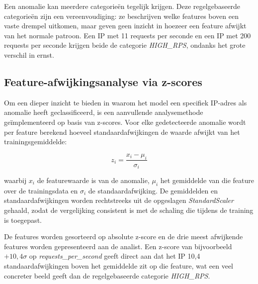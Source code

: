 Een anomalie kan meerdere categorieën tegelijk krijgen. Deze regelgebaseerde categorieën zijn een vereenvoudiging: ze beschrijven welke features boven een vaste drempel uitkomen, maar geven geen inzicht in hoezeer een feature afwijkt van het normale patroon. Een IP met 11 requests per seconde en een IP met 200 requests per seconde krijgen beide de categorie \textit{HIGH\_RPS}, ondanks het grote verschil in ernst.
 
\subsection{Feature-afwijkingsanalyse via z-scores}
\label{subsec:feature-afwijkingsanalyse}
 
Om een dieper inzicht te bieden in waarom het model een specifiek IP-adres als anomalie heeft geclassificeerd, is een aanvullende analysemethode geïmplementeerd op basis van z-scores. Voor elke gedetecteerde anomalie wordt per feature berekend hoeveel standaardafwijkingen de waarde afwijkt van het trainingsgemiddelde:
 
\begin{equation}
    z_i = \frac{x_i - \mu_i}{\sigma_i}
\end{equation}
 
waarbij $x_i$ de featurewaarde is van de anomalie, $\mu_i$ het gemiddelde van die feature over de trainingsdata en $\sigma_i$ de standaardafwijking. De gemiddelden en standaardafwijkingen worden rechtstreeks uit de opgeslagen \textit{StandardScaler} gehaald, zodat de vergelijking consistent is met de schaling die tijdens de training is toegepast.
 
De features worden gesorteerd op absolute z-score en de drie meest afwijkende features worden gepresenteerd aan de analist. Een z-score van bijvoorbeeld $+10,4\sigma$ op \textit{requests\_per\_second} geeft direct aan dat het IP 10,4 standaardafwijkingen boven het gemiddelde zit op die feature, wat een veel concreter beeld geeft dan de regelgebaseerde categorie \textit{HIGH\_RPS}.
 
 
